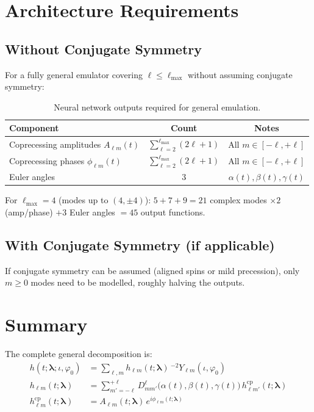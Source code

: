 \documentclass[11pt,a4paper]{article}
\newcommand{\hlm}{h_{\ell m}}
\newcommand{\hcp}{h^{\mathrm{cp}}_{\ell m}}
\newcommand{\Alm}{A_{\ell m}}
\newcommand{\philm}{\phi_{\ell m}}
\newcommand{\Ylm}{{}^{-2}Y_{\ell m}}
\newcommand{\veclambda}{\bm{\lambda}}
\begin{document}
\section{Architecture Requirements}

\subsection{Without Conjugate Symmetry}

For a fully general emulator covering $\ell \leq \ell_{\max}$ without assuming conjugate symmetry:

\begin{table}[h]
\centering
\begin{tabular}{lcc}
\toprule
\textbf{Component} & \textbf{Count} & \textbf{Notes} \\
\midrule
Coprecessing amplitudes $\Alm(t)$ & $\sum_{\ell=2}^{\ell_{\max}} (2\ell + 1)$ & All $m \in [-\ell, +\ell]$ \\
Coprecessing phases $\philm(t)$ & $\sum_{\ell=2}^{\ell_{\max}} (2\ell + 1)$ & All $m \in [-\ell, +\ell]$ \\
Euler angles & 3 & $\alpha(t), \beta(t), \gamma(t)$ \\
\bottomrule
\end{tabular}
\caption{Neural network outputs required for general emulation.}
\label{tab:surrogates}
\end{table}

For $\ell_{\max} = 4$ (modes up to $(4,\pm4)$): $5 + 7 + 9 = 21$ complex modes $\times 2$ (amp/phase) $+ 3$ Euler angles $= 45$ output functions.

\subsection{With Conjugate Symmetry (if applicable)}

If conjugate symmetry can be assumed (aligned spins or mild precession), only $m \geq 0$ modes need to be modelled, roughly halving the outputs.

\section{Summary}

The complete general decomposition is:
\begin{align}
    h(t; \veclambda; \iota, \varphi_0) &= \sum_{\ell, m} \hlm(t; \veclambda) \, \Ylm(\iota, \varphi_0) \label{eq:summary1} \\[0.5em]
    \hlm(t; \veclambda) &= \sum_{m'=-\ell}^{+\ell} D^\ell_{m m'}\bigl(\alpha(t), \beta(t), \gamma(t)\bigr) \, h^{\mathrm{cp}}_{\ell m'}(t; \veclambda) \label{eq:summary2} \\[0.5em]
    \hcp(t; \veclambda) &= \Alm(t; \veclambda) \, e^{i\philm(t; \veclambda)} \label{eq:summary3}
\end{align}
\end{document}
